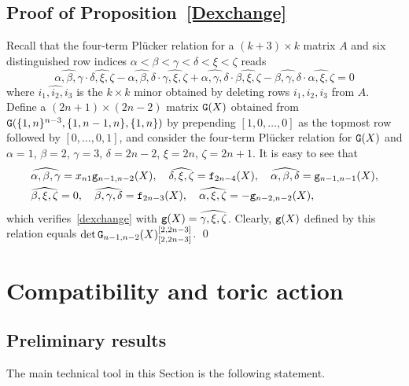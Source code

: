 \documentclass{amsart}
\theoremstyle{definition}
\theoremstyle{remark}
\newtheorem{remark}[theorem]{Remark}
\numberwithin{equation}{section}
\numberwithin{theorem}{section}
\def\NG{{\tt G}}
\def\ef{{\tt f}}
\def\eg{{\tt g}}
\begin{document}
\subsection{Proof of Proposition~\ref{Dexchange}} \label{dexchangeproof}
Recall that the four-term Pl\"ucker relation for a $(k+3)\times k$ matrix $A$ and six distinguished row indices
$\alpha< \beta< \gamma< \delta< \xi< \zeta$ reads
\[
\widehat{\alpha,\beta,\gamma}\cdot \widehat{\delta,\xi,\zeta}-\widehat{\alpha,\beta,\delta}\cdot \widehat{\gamma,\xi,\zeta}+
\widehat{\alpha,\gamma,\delta}\cdot \widehat{\beta,\xi,\zeta}-\widehat{\beta,\gamma,\delta}\cdot \widehat{\alpha,\xi,\zeta}=0
\]
where $\widehat{i_1,i_2,i_3}$ is the $k\times k$ minor obtained by deleting rows $i_1,i_2,i_3$ from $A$.
Define a $(2n+1)\times (2n-2)$ matrix $\NG(X)$ 
obtained from $\NG(\{1,n\}^{n-3},\{1,n-1,n\},\{1,n\})$ by prepending $[1,0,\ldots,0]$ as the topmost row followed by 
$[0,\ldots,0, 1]$, and consider the four-term Pl\"ucker relation for $\NG(X)$ and $\alpha=1$, $\beta=2$, $\gamma=3$, 
$\delta=2n-2$, $\xi=2n$, $\zeta=2n+1$.   It is easy to see that
\begin{align*}
& \widehat{\alpha, \beta,\gamma }=x_{n1} \eg_{n-1,n-2}(X), \quad \widehat{\delta,\xi,\zeta}=\ef_{2n-4}(X),\quad 
\widehat{\alpha,\beta, \delta}=\eg_{n-1,n-1}(X), \\  
&  \widehat{\beta,\xi, \zeta} =0, \quad\widehat{\beta,\gamma,\delta}=\ef_{2n-3}(X),
\quad \widehat{\alpha, \xi,\zeta}=-\eg_{n-2,n-2}(X),
\end{align*}
which verifies~\eqref{dexchange} with 
${\eg}(X) = \widehat{\gamma,\xi,\zeta}$. Clearly, $\eg(X)$ defined by this relation equals 
$\det\NG_{n-1,n-2}(X)_{[2,2n-3]}^{[2,2n-3]}$. \qed






\section{Compatibility and toric action}\label{compatibility}

\subsection{Preliminary results}
The main technical tool in this Section is the following statement.
\end{document}

